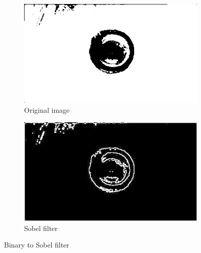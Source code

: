 \documentclass{article}
\begin{document}
%
%
\begin{figure}[H]
\centering

\begin{subfigure}{.5\textwidth}
  \centering
  \includegraphics[width=0.9\linewidth]{res/pupil/thresh_n10.jpg}
  \caption{Original image}
  \label{fig:original_img}
\end{subfigure}%
\begin{subfigure}{.5\textwidth}
  \centering
  \includegraphics[width=0.9\linewidth]{res/pupil/sobel_n.jpg}
  \caption{Sobel filter}
  \label{fig:gray_img}
\end{subfigure}


\caption{Binary to Sobel filter}
\label{fig:result_pup_thresh_sobel}
\end{figure}










\end{document}
